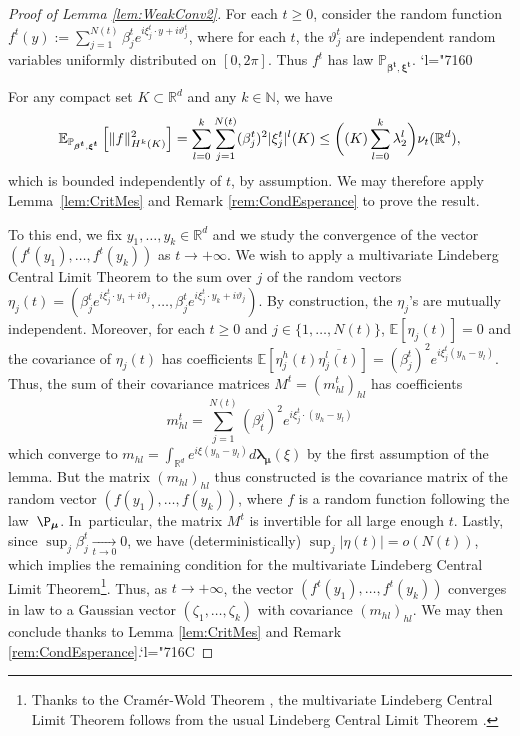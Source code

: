 \documentclass[JEP,XML,SOM,Unicode,published]{cedram}
\newcommand{\Changel}{\mathcode`l="7160}
\newcommand{\Changelback}{\mathcode`l="716C}
\newcommand{\NoChangel}[1]{%
\expandafter\let\csname old\string#1\endcsname=#1
\let#1=\relax
\newcommand{#1}{\mathcode`l="716C\csname old\string#1\endcsname\mathcode`l="7160 }%
}
\theoremstyle{plain}
\theoremstyle{definition}
\newcommand{\N}{\mathbb{N}}
\newcommand{\R}{\mathbb{R}}
\newcommand{\E}{\mathbb{E}}
\DeclareMathOperator{\Vol}{Vol}\NoChangel{\Vol}
\begin{document}
\begin{proof}[Proof of Lemma \ref{lem:WeakConv2}]
For each $t\geq 0$, consider the random function $f^t(y):=\sum_{j=1}^{N(t)}\beta_j^t e^{i\xi_j^t\cdot y+i\vartheta_j^t}$, where for each $t$, the $\vartheta_j^t$ are independent random variables uniformly distributed on $[0,2\pi]$. Thus $f^t$ has law $\mathbb{P}_{\boldsymbol{\beta^t},\boldsymbol{\xi^t}}$.
\Changel

For any compact set $K\subset \R^d$ and any $k\in \N$, we have\vspace*{-3pt}\enlargethispage{\baselineskip}%
\[
\mathbb{E}_{\mathbb{P}_{\boldsymbol{\beta^t}, \boldsymbol{\xi^t}}}\left[ \|f\|_{H^k(K)}^2 \right]= \sum_{l=0}^k \sum_{j=1}^{N(t)} (\beta_j^t)^2 |\xi_j^t|^l \Vol(K)\leq \biggl(\Vol(K)\sum_{l=0}^k\lambda_2^l\biggr)\nu_t(\R^d),
\]
which is bounded independently of $t$, by assumption. We may therefore apply Lem\-ma~\ref{lem:CritMes} and Remark \ref{rem:CondEsperance} to prove the result.

To this end, we fix $y_1,\dots,y_k\in\R^d$ and we study the convergence of the vector $(f^t(y_1),\dots,f^t(y_k))$ as $t\to +\infty$. We wish to apply a multivariate Lindeberg Central Limit Theorem to the sum over $j$ of the random vectors $\eta_j(t)=(\beta_j^te^{i\xi_j^t\cdot y_1+i\vartheta_j},\dots,\beta_j^te^{i\xi_j^t\cdot y_k+i\vartheta_j})$. By construction, the $\eta_j$'s are mutually independent. Moreover, for each $t\geq 0$ and $j\in\{1,\dots,N(t)\}$, $\E[\eta_j(t)]=0$ and the covariance of $\eta_j(t)$ has coefficients $\E[\eta_j^h(t)\overline{\eta_j^l(t)}]=(\beta_j^t)^2e^{i\xi_j^t(y_h-y_l)}$. Thus, the sum of their covariance matrices $M^t=(m^t_{hl})_{hl}$ has coefficients\vspace*{-3pt}
\[
m^t_{hl}=\sum_{j=1}^{N(t)}(\beta_t^j)^2e^{i\xi_j^t\cdot(y_h-y_l)}
\]
which converge to $m_{hl}=\int_{\R^d} e^{i\xi(y_h-y_l)}d\boldsymbol{\lambda_\mu}(\xi)$ by the first assumption of the lemma. But the matrix $(m_{hl})_{hl}$ thus constructed is the covariance matrix of the random vector $(f(y_1),\dots,f(y_k))$, where $f$ is a random function following the law~$\P_{\boldsymbol{\mu}}$. In~particular, the matrix $M^t$ is invertible for all large enough $t$. Lastly, since $\sup_j \beta_j^t \xrightarrow[t\to 0]{}0$, we have (deterministically) $\sup_j|\eta(t)|=o(N(t))$, which implies the remaining condition for the multivariate Lindeberg Central Limit Theorem\footnote{Thanks to the Cramér-Wold Theorem \cite[Th.\,29.4]{Bili}, the multivariate Lindeberg Central Limit Theorem follows from the usual Lindeberg Central Limit Theorem \cite[Chap.\,27]{Bili}.}. Thus, as $t\to +\infty$, the vector $(f^t(y_1),\dots,f^t(y_k))$ converges in law to a Gaussian vector $(\zeta_1,\dots,\zeta_k)$ with covariance $(m_{hl})_{hl}$. We may then conclude thanks to Lemma \ref{lem:CritMes} and Remark \ref{rem:CondEsperance}.\Changelback
\end{proof}
\end{document}
